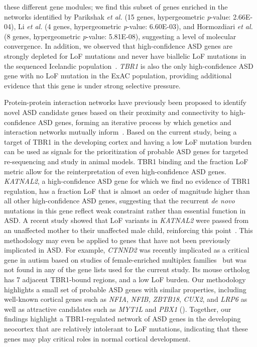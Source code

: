 these different gene modules; we find this subset of genes enriched in
the networks identified by Parikshak \emph{et al.} (15 genes,
hypergeometric \emph{p}-value: 2.66E-04), Li \emph{et al.} (4 genes,
hypergeometric \emph{p}-value: 6.60E-03), and Hormozdiari \emph{et al.}
(8 genes, hypergeometric \emph{p}-value: 5.81E-08), suggesting a level
of molecular convergence. In addition, we observed that high-confidence
ASD genes are strongly depleted for LoF mutations and never have
biallelic LoF mutations in the sequenced Icelandic population~\citep{Sulem:2015fi}. \emph{TBR1} is also the only high-confidence ASD gene with no
LoF mutation in the ExAC population, providing additional evidence that
this gene is under strong selective pressure.

Protein-protein interaction networks have previously been proposed to
identify novel ASD candidate genes based on their proximity and
connectivity to high-confidence ASD genes, forming an iterative process
by which genetics and interaction networks mutually inform~\citep{Krumm:2014hd}. Based on the current study, being a target of TBR1 in the
developing cortex and having a low LoF mutation burden can be used as
signals for the prioritization of probable ASD genes for targeted
re-sequencing and study in animal models. TBR1 binding and the fraction
LoF metric allow for the reinterpretation of even high-confidence ASD
genes. \emph{KATNAL2}, a high-confidence ASD gene for which we find no
evidence of TBR1 regulation, has a fraction LoF that is almost an order
of magnitude higher than all other high-confidence ASD genes, suggesting
that the recurrent \emph{de novo} mutations in this gene reflect weak
constraint rather than essential function in ASD. A recent study showed
that LoF variants in \emph{KATNAL2} were passed from an unaffected
mother to their unaffected male child, reinforcing this point~\citep{Iossifov:2015gi}. This methodology may even be applied to genes that have
not been previously implicated in ASD. For example, \emph{CTNND2} was
recently implicated as a critical gene in autism based on studies of
female-enriched multiplex families~\citep{Turner:2015jb} but was not
found in any of the gene lists used for the current study. Its mouse
ortholog has 7 adjacent TBR1-bound regions, and a low LoF burden. Our
methodology highlights a small set of probable ASD genes with similar
properties, including well-known cortical genes such as \emph{NFIA},
\emph{NFIB,} \emph{ZBTB18}, \emph{CUX2}, and \emph{LRP6} as well as
attractive candidates such as \emph{MYT1L} and \emph{PBX1} ().
Together, our findings highlight a TBR1-regulated network of ASD genes
in the developing neocortex that are relatively intolerant to LoF
mutations, indicating that these genes may play critical roles in normal
cortical development.

